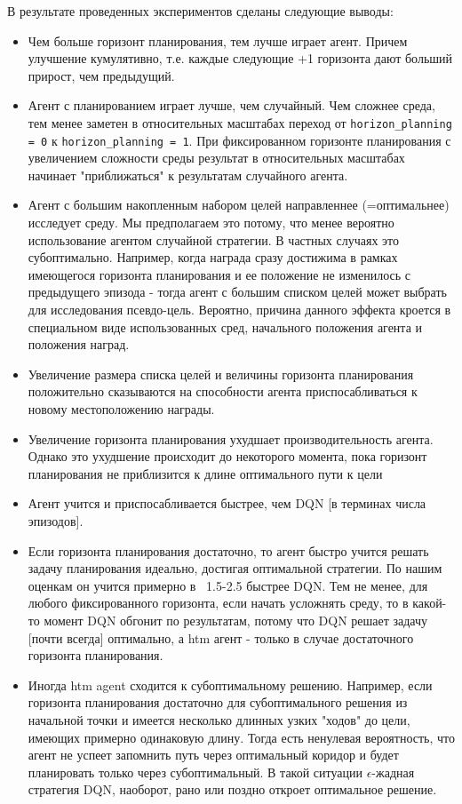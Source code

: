 \documentclass[a4paper]{article}
\begin{document}
В результате проведенных экспериментов сделаны следующие выводы:

\begin{itemize}
  \item Чем больше горизонт планирования, тем лучше играет агент. Причем улучшение кумулятивно, т.е. каждые следующие +1 горизонта дают больший прирост, чем предыдущий.

  \item Агент с планированием играет лучше, чем случайный. Чем сложнее среда, тем менее заметен в относительных масштабах переход от \verb|horizon_planning = 0| к \verb|horizon_planning = 1|. При фиксированном горизонте планирования с увеличением сложности среды результат в относительных масштабах начинает "приближаться" к результатам случайного агента.

  \item Агент с большим накопленным набором целей направленнее (=оптимальнее) исследует среду. Мы предполагаем это потому, что менее вероятно использование агентом случайной стратегии. В частных случаях это субоптимально. Например, когда награда сразу достижима в рамках имеющегося горизонта планирования и ее положение не изменилось с предыдущего эпизода - тогда агент с большим списком целей может выбрать для исследования псевдо-цель. Вероятно, причина данного эффекта кроется в специальном виде использованных сред, начального положения агента и положения наград.

  \item Увеличение размера списка целей и величины горизонта планирования положительно сказываются на способности агента приспосабливаться к новому местоположению награды.

  \item Увеличение горизонта планирования ухудшает производительность агента. Однако это ухудшение происходит до некоторого момента, пока горизонт планирования не приблизится к длине оптимального пути к цели
  \item Агент учится и приспосабливается быстрее, чем DQN [в терминах числа эпизодов].

  \item Если горизонта планирования достаточно, то агент быстро учится решать задачу планирования идеально, достигая оптимальной стратегии. По нашим оценкам он учится примерно в ~1.5-2.5 быстрее DQN. Тем не менее, для любого фиксированного горизонта, если начать усложнять среду, то в какой-то момент DQN обгонит по результатам, потому что DQN решает задачу [почти всегда] оптимально, а htm агент - только в случае достаточного горизонта планирования.

  \item Иногда htm agent сходится к субоптимальному решению. Например, если горизонта планирования достаточно для субоптимального решения из начальной точки и имеется несколько длинных узких "ходов" до цели, имеющих примерно одинаковую длину. Тогда есть ненулевая вероятность, что агент не успеет запомнить путь через оптимальный коридор и будет планировать только через субоптимальный. В такой ситуации $\epsilon$-жадная стратегия DQN, наоборот, рано или поздно откроет оптимальное решение.
\end{itemize}
\end{document}
